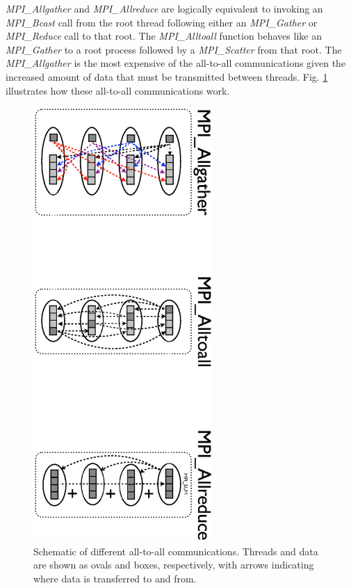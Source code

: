 \emph{MPI\_Allgather} and \emph{MPI\_Allreduce} are logically equivalent to
invoking an \emph{MPI\_Bcast} call from the root thread following either an
\emph{MPI\_Gather} or \emph{MPI\_Reduce} call to that root. The
\emph{MPI\_Alltoall} function behaves like an \emph{MPI\_Gather} to a root
process followed by a \emph{MPI\_Scatter} from that root. The
\emph{MPI\_Allgather} is the most expensive of the all-to-all communications
given the increased amount of data that must be transmitted between threads.
Fig. \ref{figC:AllToAll} illustrates how these all-to-all communications work.

\begin{figure}
   \includegraphics[height=6.5in, angle=90, trim=7.5cm 0cm 0cm 0cm, clip=true]
            {AllToAll.ps}
   \caption[Schematic of different all-to-all communications. Threads and data
            are shown as ovals and boxes, respectively]
           {Schematic of different all-to-all communications. Threads and data
            are shown as ovals and boxes, respectively, with arrows indicating
            where data is transferred to and from.}
   \label{figC:AllToAll}
\end{figure}

